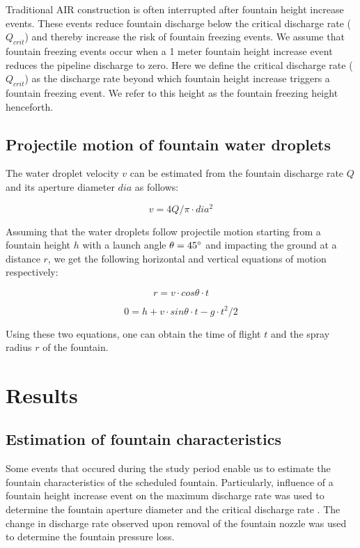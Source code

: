 \documentclass[tc, manuscript]{copernicus}
\begin{document}
Traditional AIR construction is often interrupted after fountain height increase events. These events reduce
fountain discharge below the critical discharge rate ($Q_{crit}$) and thereby increase the risk of fountain
freezing events. We assume that fountain freezing events occur when a 1 meter fountain height increase event
reduces the pipeline discharge to zero.  Here we define the critical discharge rate ($Q_{crit}$) as the
discharge rate beyond which fountain height increase triggers a fountain freezing event. We refer to this height
as the fountain freezing height henceforth.


\subsection{Projectile motion of fountain water droplets} \label{sec:proj}

The water droplet velocity $v$ can be estimated from the fountain discharge rate $Q$ and its aperture diameter
$dia$ as follows:

\begin{equation}
  v = 4Q/\pi \cdot dia^2
\end{equation}

Assuming that the water droplets follow projectile motion starting from a fountain height $h$ with a launch
angle $\theta = 45 ^{\circ}$ and impacting the ground at a distance $r$, we get the following horizontal and
vertical equations of motion respectively:

\begin{equation}
  \label{eqn:radf}
  r = v \cdot cos \theta \cdot t
\end{equation}

\begin{equation}
  0 = h + v \cdot sin \theta \cdot t - g\cdot t^2/2
\end{equation}

Using these two equations, one can obtain the time of flight $t$ and the spray radius $r$ of the fountain.

\section{Results}

\subsection{Estimation of fountain characteristics}

Some events that occured during the study period enable us to estimate the fountain characteristics of the
scheduled fountain. Particularly, influence of a fountain height increase event on the maximum discharge rate
was used to determine the fountain aperture diameter and the critical discharge rate  . The change in discharge
rate observed upon removal of the fountain nozzle was used to determine the fountain pressure loss.
\end{document}
